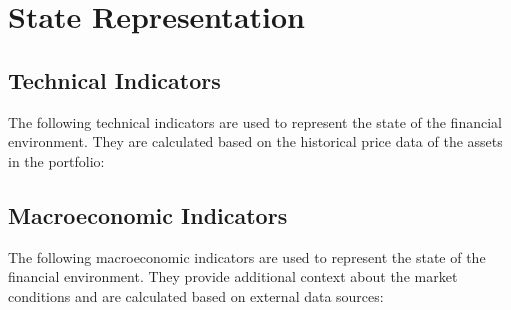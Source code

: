 \chapter{State Representation} \label{app:state_representation}

\section{Technical Indicators} \label{sec:technical-indicators}

The following technical indicators are used to represent the state of the financial environment. They are calculated based on the historical price data of the assets in the portfolio:

\section{Macroeconomic Indicators} \label{sec:macroeconomic-indicators}

The following macroeconomic indicators are used to represent the state of the financial environment. They provide additional context about the market conditions and are calculated based on external data sources: